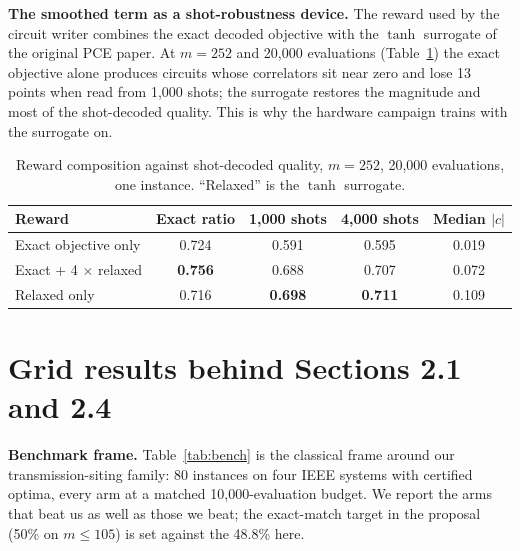 \documentclass[10pt,a4paper]{article}
\begin{document}
\textbf{The smoothed term as a shot-robustness device.} The reward used by the
circuit writer combines the exact decoded objective with the $\tanh$
surrogate of the original PCE paper. At $m=252$ and 20,000 evaluations
(Table~\ref{tab:reward}) the exact objective alone produces circuits whose
correlators sit near zero and lose 13 points when read from 1,000 shots; the
surrogate restores the magnitude and most of the shot-decoded quality. This is
why the hardware campaign trains with the surrogate on.

\begin{table}[h]
\centering
\caption{Reward composition against shot-decoded quality, $m=252$, 20,000
evaluations, one instance. ``Relaxed'' is the $\tanh$ surrogate.}
\label{tab:reward}
\begin{tabular}{lcccc}
\toprule
Reward & Exact ratio & 1,000 shots & 4,000 shots & Median $|c|$ \\
\midrule
Exact objective only & 0.724 & 0.591 & 0.595 & 0.019 \\
Exact + 4 $\times$ relaxed & \textbf{0.756} & 0.688 & 0.707 & 0.072 \\
Relaxed only & 0.716 & \textbf{0.698} & \textbf{0.711} & 0.109 \\
\bottomrule
\end{tabular}
\end{table}

\section{Grid results behind Sections 2.1 and 2.4}

\textbf{Benchmark frame.} Table~\ref{tab:bench} is the classical frame around
our transmission-siting family: 80 instances on four IEEE systems with
certified optima, every arm at a matched 10,000-evaluation budget. We report
the arms that beat us as well as those we beat; the exact-match target in the
proposal (50\% on $m\le105$) is set against the 48.8\% here.
\end{document}
